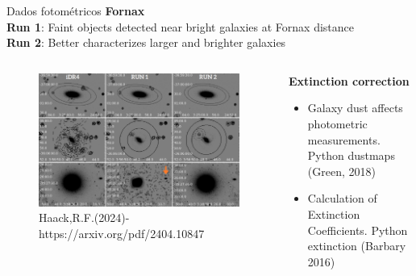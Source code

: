 \begin{frame}[c]{Dados fotométricos}
    \textbf{Fornax}\\
    \textbf{Run 1}: Faint objects detected near bright galaxies at Fornax distance\\
    \textbf{Run 2}: Better characterizes larger and brighter galaxies
    \begin{columns}[c]
        \begin{column}{0.48\linewidth}
                    \begin{figure}
                        \centering
                        \includegraphics[width=\linewidth]{images/run1.png}
                        \caption{Haack,R.F.(2024)-https://arxiv.org/pdf/2404.10847}
                    \end{figure}
                \end{column}
        \begin{column}{0.48\linewidth}
                    \textbf{Extinction correction}
                    \begin{itemize}
                        \item Galaxy dust affects photometric measurements. Python dustmaps (Green, 2018)
                        \item Calculation of Extinction Coefficients. Python extinction (Barbary 2016)
                    \end{itemize}
                \end{column}
    \end{columns}
\end{frame}

